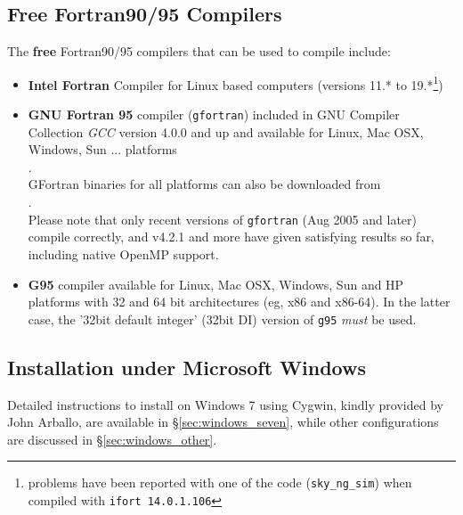 \documentclass[12pt,twoside]{article}
\begin{document}
\subsection{Free Fortran90/95 Compilers}
\label{sec:freef90compilers}
The {\bf free} Fortran90/95 compilers that can be used to compile \healpix include: 
    \begin{itemize}
      \item {\bf Intel Fortran} Compiler for Linux based computers (versions
11.* to 19.*\footnote{problems have been reported with one of the code (\texttt{sky\_ng\_sim}) when compiled with
\texttt{ifort 14.0.1.106}}) \hfill \\
      \item {\bf GNU Fortran 95} compiler (\texttt{gfortran}) included in GNU Compiler Collection {\em GCC} version 4.0.0
         and up and available for Linux, Mac OSX, Windows, Sun ... platforms
         \hfill \\
          . \hfill \\
         GFortran binaries for all platforms can also be downloaded from  \hfill \\
          . \hfill \\
         Please note that only recent versions of \texttt{gfortran} (Aug 2005
         and later) compile \healpix correctly, and v4.2.1 and more have given satisfying
         results so far, including native OpenMP support.
     \item {\bf G95} compiler available for Linux, Mac OSX, Windows, Sun and HP platforms with 32 and 64 bit architectures (eg, x86 and x86-64). In the latter case, the '32bit default integer' (32bit DI) version of \texttt{g95} {\em must} be used.
         \hfill \\ 
    \end{itemize}

\newpage %
\subsection{Installation under Microsoft Windows}
\label{sec:windows}
Detailed instructions to install \healpix on Windows 7 using Cygwin, kindly provided by John Arballo, 
are available in \S\ref{sec:windows_seven}, 
while other configurations are discussed in \S\ref{sec:windows_other}.
\end{document}
